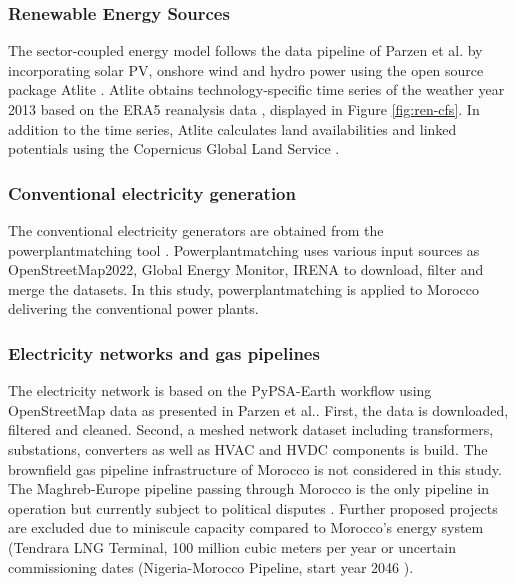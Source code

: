 \documentclass[5p,numafflabel]{elsarticle}
\begin{document}
\subsubsection*{Renewable Energy Sources}
The sector-coupled energy model follows the data pipeline of Parzen et al.\cite{Parzen2023} by incorporating solar PV, onshore wind and hydro power using the open source package Atlite \cite{Hofmann2021}.
Atlite obtains technology-specific time series of the weather year 2013 based on the ERA5 reanalysis data \cite{Hersbach2020}, displayed in Figure \ref{fig:ren-cfs}. In addition to the time series, Atlite calculates land availabilities and linked potentials using the Copernicus Global Land Service \cite{Buchhorn2020}.






\subsubsection*{Conventional electricity generation}
The conventional electricity generators are obtained from the powerplantmatching tool \cite{Powerplantmatching2019}. Powerplantmatching uses various input sources as OpenStreetMap2022, Global Energy Monitor, IRENA \cite{IRENA2022, OpenStreetMap2022, GlobalEnergyMonitor} to download, filter and merge the datasets. 
In this study, powerplantmatching is applied to Morocco delivering the conventional power plants.

\subsubsection*{Electricity networks and gas pipelines}
The electricity network is based on the PyPSA-Earth workflow using OpenStreetMap data \cite{OpenStreetMap2022} as presented in Parzen et al.\cite{Parzen2023}. First, the data is downloaded, filtered and cleaned. Second, a meshed network dataset including transformers, substations, converters as well as HVAC and HVDC components is build\cite{Parzen2023}. 
The brownfield gas pipeline infrastructure of Morocco is not considered in this study. The Maghreb-Europe pipeline passing through Morocco is the only pipeline in operation but currently subject to political disputes \cite{Rachidi2022}. Further proposed projects are excluded due to  miniscule capacity compared to Morocco's energy system (Tendrara LNG Terminal, 100 million cubic meters per year or uncertain commissioning dates (Nigeria-Morocco Pipeline, start year 2046 \cite{GEM2023b}).
\end{document}
